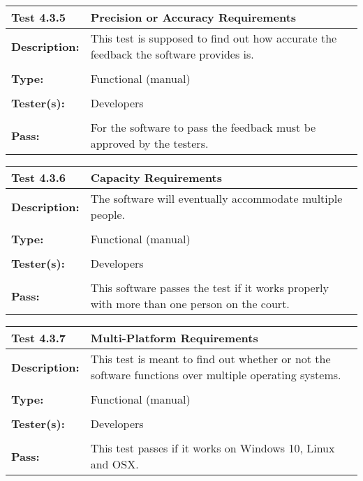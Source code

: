 \documentclass{article}
\begin{document}
\begin{tabularx}{\textwidth}{p{2cm}p{9cm}}
\toprule 
{\bf Test 4.3.5} & {\bf Precision or Accuracy Requirements}\\
\midrule
\textbf{Description:} & This test is supposed to find out how accurate the feedback the software provides is. \\[0.3\baselineskip]
                      &                     \\
\textbf{Type:} & Functional (manual)   \\[0.3\baselineskip]
                      &                     \\
\textbf{Tester(s):} & Developers \\[0.3\baselineskip]
                      &                     \\
\textbf{Pass:} & For the software to pass the feedback must be approved by the testers. \\[0.3\baselineskip]
\bottomrule
\end{tabularx}

\begin{tabularx}{\textwidth}{p{2cm}p{9cm}}
\toprule 
{\bf Test 4.3.6} & {\bf Capacity Requirements}\\
\midrule
\textbf{Description:} & The software will eventually accommodate multiple people. \\[0.3\baselineskip]
                      &                     \\
\textbf{Type:} & Functional (manual)   \\[0.3\baselineskip]
                      &                     \\
\textbf{Tester(s):} & Developers \\[0.3\baselineskip]
                      &                     \\
\textbf{Pass:} & This software passes the test if it works properly with more than one person on the court. \\[0.3\baselineskip]
\end{tabularx}

\begin{tabularx}{\textwidth}{p{2cm}p{9cm}}
\toprule 
{\bf Test 4.3.7} & {\bf Multi-Platform Requirements}\\
\midrule
\textbf{Description:} &  This test is meant to find out whether or not the software functions over multiple operating systems.\\[0.3\baselineskip]
                      &                     \\
\textbf{Type:} & Functional (manual)   \\[0.3\baselineskip]
                      &                     \\
\textbf{Tester(s):} & Developers \\[0.3\baselineskip]
                      &                     \\
\textbf{Pass:} & This test passes if it works on Windows 10, Linux and OSX. \\[0.3\baselineskip]
\end{tabularx}
\end{document}
